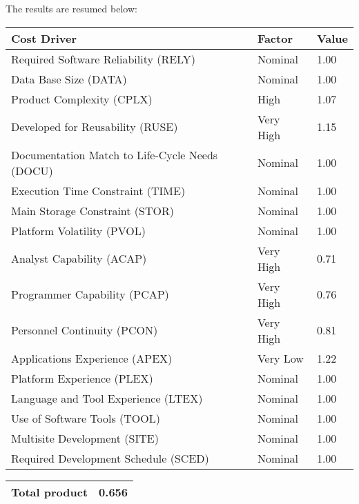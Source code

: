 \documentclass[\mainpath/main]{subfiles}
\begin{document}
The results are resumed below:
\begin{table}[h]
	\begin{tabular}{|L{8.5cm}|C{2.5cm}|C{2cm}|}
		\hline \textbf{Cost Driver} & \textbf{Factor} & \textbf{Value} \\
		\hline Required Software Reliability (RELY) & Nominal & 1.00 \\
		\hline Data Base Size (DATA) & Nominal & 1.00 \\
		\hline Product Complexity (CPLX) & High & 1.07 \\
		\hline Developed for Reusability (RUSE) & Very High & 1.15 \\
		\hline Documentation Match to Life-Cycle Needs (DOCU) & Nominal & 1.00 \\
		\hline Execution Time Constraint (TIME) & Nominal & 1.00 \\
		\hline Main Storage Constraint (STOR) & Nominal & 1.00 \\
		\hline Platform Volatility (PVOL) & Nominal & 1.00 \\
		\hline Analyst Capability (ACAP) & Very High & 0.71 \\
		\hline Programmer Capability (PCAP) & Very High & 0.76 \\
		\hline Personnel Continuity (PCON) & Very High & 0.81 \\
		\hline Applications Experience (APEX) & Very Low & 1.22 \\
		\hline Platform Experience (PLEX) & Nominal & 1.00 \\
		\hline Language and Tool Experience (LTEX) & Nominal & 1.00 \\
		\hline Use of Software Tools (TOOL) & Nominal & 1.00 \\
		\hline Multisite Development (SITE) & Nominal & 1.00 \\
		\hline Required Development Schedule (SCED) & Nominal & 1.00 \\
		\hline 
	\end{tabular} 
	\begin{tabular}{|L{11.43cm}|C{2cm}|}
		\hline \textbf{Total product} & \textbf{0.656} \\
		\hline
	\end{tabular}
\end{table}
\end{document}
